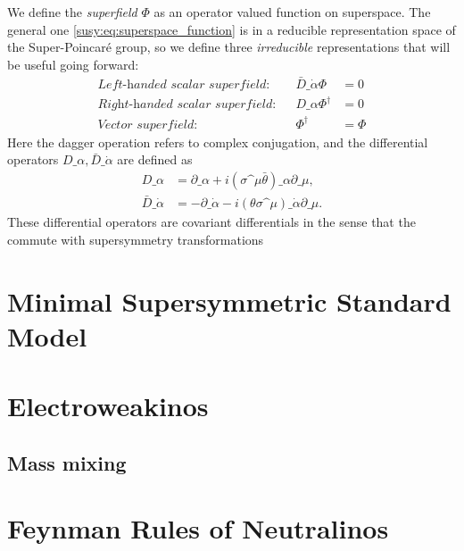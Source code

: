         We define the \emph{superfield} \(\Phi\) as an operator valued function on superspace.
        The general one \cref{susy:eq:superspace_function} is in a reducible representation space of the Super-Poincaré group, so we define three \emph{irreducible} representations that will be useful going forward:
        \begin{align}
            \textit{Left-handed scalar superfield:}  &  & \bar{D}\_{\dot\alpha}\Phi & = 0    \\
            \textit{Right-handed scalar superfield:} &  & D\_{\alpha}\Phi^\dagger   & = 0    \\
            \textit{Vector superfield:}              &  & \Phi^\dagger              & = \Phi
        \end{align}
        Here the dagger operation refers to complex conjugation, and the differential operators \(D\_\alpha, \bar{D}\_{\dot\alpha}\) are defined as
        \begin{subequations}
            \begin{align}
                D\_\alpha             & = \partial\_\alpha + i(\sigma\^\mu \bar\theta)\_\alpha \partial\_\mu,          \\
                \bar{D}\_{\dot\alpha} & = -\partial\_{\dot\alpha} - i (\theta\sigma\^\mu)\_{\dot\alpha} \partial\_\mu.
            \end{align}
        \end{subequations}
        These differential operators are covariant differentials in the sense that the commute with supersymmetry transformations

\section{Minimal Supersymmetric Standard Model}

\section{Electroweakinos}
    \subsection{Mass mixing}

\section{Feynman Rules of Neutralinos}
